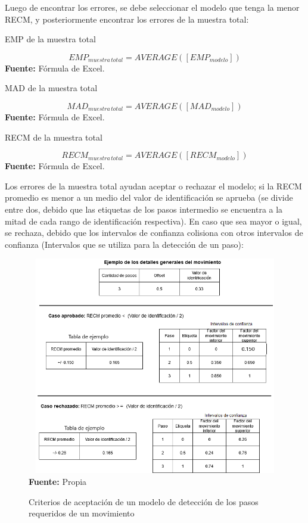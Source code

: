Luego de encontrar los errores, se debe seleccionar el modelo que tenga la menor \acrshort{RECM}, y posteriormente encontrar los errores de la muestra total:
 \begin{formula}[H]
	\centering
	\caption{EMP de la muestra total}
	\label{frm:EmpAll}
	\begin{equation}
EMP_{muestra\, total}=AVERAGE([EMP_{modelo}])
	\end{equation}
	\textbf{Fuente:} F\'ormula de Excel.
\end{formula}  
 \begin{formula}[H]
	\centering
	\caption{MAD de la muestra total}
	\label{frm:MadAll}
	\begin{equation}
MAD_{muestra\, total}=AVERAGE([MAD_{modelo}])
	\end{equation}
	\textbf{Fuente:} F\'ormula de Excel.
\end{formula}  
	 \begin{formula}[H]
	\centering
	\caption{RECM de la muestra total}
	\label{frm:RecmAll}
	\begin{equation}
RECM_{muestra\, total}=AVERAGE([RECM_{modelo}])
	\end{equation}
	\textbf{Fuente:} F\'ormula de Excel.
\end{formula} 
Los errores de la muestra total ayudan aceptar o rechazar el modelo; si la \acrshort{RECM} promedio  es menor a un medio del valor de identificaci\'on se aprueba (se divide entre dos, debido que las etiquetas de los pasos intermedio se encuentra a la mitad de cada rango de identificaci\'on respectiva). En caso que sea mayor o igual, se rechaza, debido que los intervalos de confianza colisiona con otros intervalos de confianza (Intervalos que se utiliza para la detecci\'on de un paso):
\begin{figure}[H]
	\caption{Criterios de aceptaci\'on de un modelo de detecci\'on de los pasos requeridos de un movimiento}
	\label{fig:AproveOrDennie}
	\centering
	\includegraphics[width=430px,height=360px]{graphics/CriterioAceptacion.png} \\
	\textbf{Fuente:} Propia
\end{figure}
